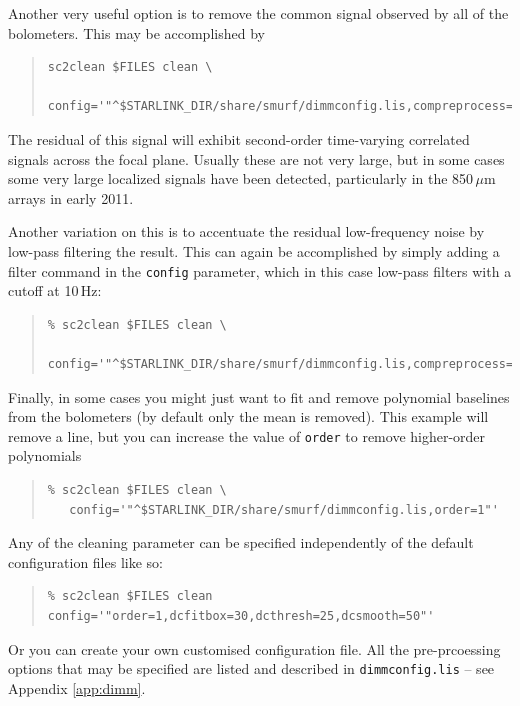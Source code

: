\documentclass[twoside,11pt]{article}
\newcounter{box}
\renewcommand{\_}{\texttt{\symbol{95}}}
\newenvironment{myquote}{\begin{quote}\begin{small}}{\end{small}\end{quote}}
\begin{document}
Another very useful option is to remove the common signal observed by all of the bolometers. This may be accomplished by

\begin{myquote}
\begin{verbatim}
sc2clean $FILES clean \
   config='"^$STARLINK_DIR/share/smurf/dimmconfig.lis,compreprocess=1"'
\end{verbatim}
\end{myquote}

The residual of this signal will exhibit second-order time-varying
correlated signals across the focal plane. Usually these are not very
large, but in some cases some very large localized signals have been
detected, particularly in the 850\,$\mu$m arrays in early 2011.

Another variation on this is to accentuate the residual low-frequency
noise by low-pass filtering the result. This can again be accomplished
by simply adding a filter command in the \texttt{config} parameter,
which in this case low-pass filters with a cutoff at 10\,Hz:

\begin{myquote}
\begin{verbatim}
% sc2clean $FILES clean \
   config='"^$STARLINK_DIR/share/smurf/dimmconfig.lis,compreprocess=1,filt_edgelow=10"'
\end{verbatim}
\end{myquote}

Finally, in some cases you might just want to fit and remove
polynomial baselines from the bolometers (by default only the mean is
removed). This example will remove a line, but you can increase the
value of \texttt{order} to remove higher-order polynomials

\begin{myquote}
\begin{verbatim}
% sc2clean $FILES clean \
   config='"^$STARLINK_DIR/share/smurf/dimmconfig.lis,order=1"'
\end{verbatim}
\end{myquote}

Any of the cleaning parameter can be specified independently of the default configuration files like so:
\begin{myquote}
\begin{verbatim}
% sc2clean $FILES clean config='"order=1,dcfitbox=30,dcthresh=25,dcsmooth=50"'
\end{verbatim}
\end{myquote}
Or you can create your own customised configuration file. All the pre-prcoessing options that may be specified are listed and described in \texttt{dimmconfig.lis} -- see Appendix \ref{app:dimm}.
\end{document}
